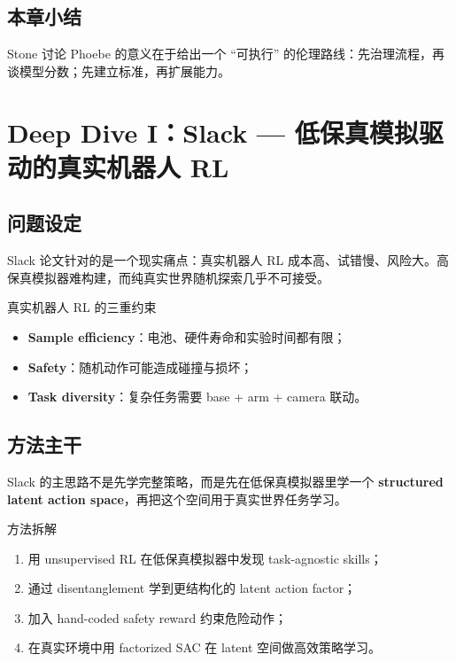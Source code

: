 \documentclass[a4paper]{article}
\begin{document}
\subsection{本章小结}
Stone 讨论 Phoebe 的意义在于给出一个 ``可执行'' 的伦理路线：先治理流程，再谈模型分数；先建立标准，再扩展能力。

\section{Deep Dive I：Slack --- 低保真模拟驱动的真实机器人 RL}

\subsection{问题设定}
Slack 论文针对的是一个现实痛点：真实机器人 RL 成本高、试错慢、风险大。高保真模拟器难构建，而纯真实世界随机探索几乎不可接受。

\begin{warningbox}{真实机器人 RL 的三重约束}
\begin{itemize}
    \item \textbf{Sample efficiency}：电池、硬件寿命和实验时间都有限；
    \item \textbf{Safety}：随机动作可能造成碰撞与损坏；
    \item \textbf{Task diversity}：复杂任务需要 base + arm + camera 联动。
\end{itemize}
\end{warningbox}

\subsection{方法主干}
Slack 的主思路不是先学完整策略，而是先在低保真模拟器里学一个 \textbf{structured latent action space}，再把这个空间用于真实世界任务学习。

\begin{knowledgebox}{方法拆解}
\begin{enumerate}
    \item 用 unsupervised RL 在低保真模拟器中发现 task-agnostic skills；
    \item 通过 disentanglement 学到更结构化的 latent action factor；
    \item 加入 hand-coded safety reward 约束危险动作；
    \item 在真实环境中用 factorized SAC 在 latent 空间做高效策略学习。
\end{enumerate}
\end{knowledgebox}
\end{document}
